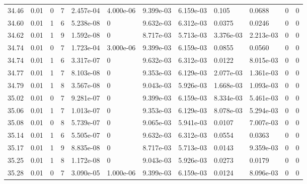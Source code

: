 \documentclass[preview]{standalone}
\begin{document}
{{{{{{{{{{{{\begin{tabular}{L{1.2cm}C{1.2cm} C{0.3cm}C{0.5cm} C{1.4cm}C{1.4cm} C{1.4cm}C{1.4cm} C{1.6cm}C{1.6cm} C{1.6cm}C{1.6cm}}
  34.46  &  0.01  & 0     &  7 &  2.457e-04  & 4.000e-06  &  9.399e-03&   6.159e-03& 0.105 & 0.0688   &  0 & 0  \\ 
  34.60  &  0.01  & 1     &  6 &  5.238e-08  & 0  &  9.632e-03&   6.312e-03& 0.0375 & 0.0246   &  0 & 0  \\ 
  34.62  &  0.01  & 1     &  9 &  1.592e-08  & 0  &  8.717e-03&   5.713e-03& 3.376e-03 & 2.213e-03   &  0 & 0  \\ 
  34.74  &  0.01  & 0     &  7 &  1.723e-04  & 3.000e-06  &  9.399e-03&   6.159e-03& 0.0855 & 0.0560   &  0 & 0  \\ 
  34.74  &  0.01  & 1     &  6 &  3.317e-07  & 0  &  9.632e-03&   6.312e-03& 0.0122 & 8.015e-03   &  0 & 0  \\ 
  34.77  &  0.01  & 1     &  7 &  8.103e-08  & 0  &  9.353e-03&   6.129e-03& 2.077e-03 & 1.361e-03   &  0 & 0  \\ 
  34.79  &  0.01  & 1     &  8 &  3.567e-08  & 0  &  9.043e-03&   5.926e-03& 1.668e-03 & 1.093e-03   &  0 & 0  \\ 
  35.02  &  0.01  & 0     &  7 &  9.281e-07  & 0  &  9.399e-03&   6.159e-03& 8.334e-03 & 5.461e-03   &  0 & 0  \\ 
  35.06  &  0.01  & 1     &  7 &  1.013e-07  & 0  &  9.353e-03&   6.129e-03& 8.078e-03 & 5.294e-03   &  0 & 0  \\ 
  35.08  &  0.01  & 0     &  8 &  5.739e-07  & 0  &  9.065e-03&   5.941e-03& 0.0107 & 7.007e-03   &  0 & 0  \\ 
  35.14  &  0.01  & 1     &  6 &  5.505e-07  & 0  &  9.632e-03&   6.312e-03& 0.0554 & 0.0363   &  0 & 0  \\ 
  35.17  &  0.01  & 1     &  9 &  8.835e-08  & 0  &  8.717e-03&   5.713e-03& 0.0143 & 9.359e-03   &  0 & 0  \\ 
  35.25  &  0.01  & 1     &  8 &  1.172e-08  & 0  &  9.043e-03&   5.926e-03& 0.0273 & 0.0179   &  0 & 0  \\ 
  35.28  &  0.01  & 0     &  7 &  3.090e-05  & 1.000e-06  &  9.399e-03&   6.159e-03& 0.0124 & 8.096e-03   &  0 & 0  \\ 
\hline 
\end{tabular} 

}}}}}}}}}}}}
\end{document}
